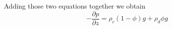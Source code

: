 Adding those two equations together we obtain
\begin{equation}
-\frac{\partial p}{\partial z} = \rho_c (1-\phi) g + \rho_d \phi g 
\end{equation}









